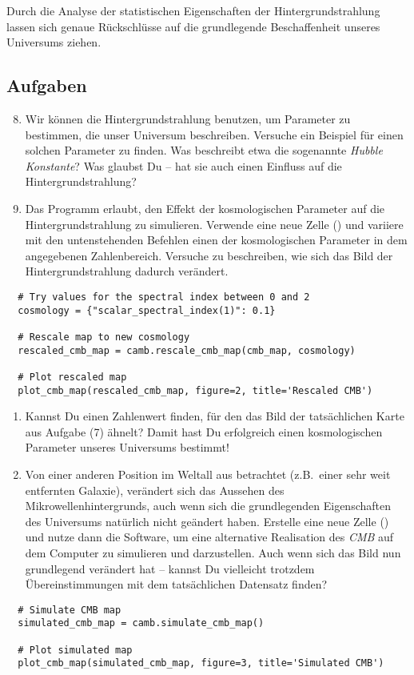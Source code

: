 \documentclass[12pt,twoside,a4paper]{article}
\newcommand{\cmb}{\emph{CMB}\xspace}
\newcommand{\plus}{\raisebox{-0.3ex}{\faPlusSquareO}\xspace}
\begin{document}
Durch die Analyse der statistischen Eigenschaften der
Hintergrundstrahlung lassen sich genaue R\"uckschl\"usse auf
die grundlegende Beschaffenheit unseres Universums ziehen.


\subsection{Aufgaben}

\begin{enumerate}
  \setcounter{enumi}{7}
\item Wir k\"onnen die Hintergrundstrahlung benutzen, um Parameter zu
  bestimmen, die unser Universum beschreiben. Versuche ein Beispiel
  f\"ur einen solchen Parameter zu finden. Was beschreibt etwa die
  sogenannte \emph{Hubble Konstante}? Was glaubst Du -- hat sie auch
  einen Einfluss auf die Hintergrundstrahlung?
\item Das Programm erlaubt, den Effekt der kosmologischen Parameter
  auf die Hintergrundstrahlung zu simulieren. Verwende eine neue Zelle
  (\plus) und variiere mit den untenstehenden Befehlen einen der
  kosmologischen Parameter in dem angegebenen Zahlenbereich. Versuche
  zu beschreiben, wie sich das Bild der Hintergrundstrahlung dadurch
  ver\"andert.
\end{enumerate}
\vspace{-1ex}
\begin{lstlisting}
  # Try values for the spectral index between 0 and 2
  cosmology = {"scalar_spectral_index(1)": 0.1}

  # Rescale map to new cosmology
  rescaled_cmb_map = camb.rescale_cmb_map(cmb_map, cosmology)

  # Plot rescaled map
  plot_cmb_map(rescaled_cmb_map, figure=2, title='Rescaled CMB')
\end{lstlisting}
\vspace{-1ex}
\begin{enumerate}
\item[] Kannst Du einen Zahlenwert finden, f\"ur den das Bild der
  tats\"achlichen Karte aus Aufgabe (7) \"ahnelt? Damit hast Du
  erfolgreich einen kosmologischen Parameter unseres Universums
  bestimmt!
\setcounter{enumi}{9}
\item Von einer anderen Position im Weltall aus betrachtet
  (z.B.\ einer sehr weit entfernten Galaxie), ver\"andert sich das
  Aussehen des Mikrowellenhintergrunds, auch wenn sich die
  grundlegenden Eigenschaften des Universums nat\"urlich nicht
  ge\"andert haben. Erstelle eine neue Zelle (\plus) und nutze dann
  die Software, um eine alternative Realisation des \cmb auf dem
  Computer zu simulieren und darzustellen. Auch wenn sich das Bild nun
  grundlegend ver\"andert hat -- kannst Du vielleicht trotzdem
  \"Ubereinstimm\-ungen mit dem tats\"achlichen Datensatz finden?
\end{enumerate}
\vspace{-1ex}
\begin{lstlisting}
  # Simulate CMB map
  simulated_cmb_map = camb.simulate_cmb_map()

  # Plot simulated map
  plot_cmb_map(simulated_cmb_map, figure=3, title='Simulated CMB')
\end{lstlisting}
\end{document}
